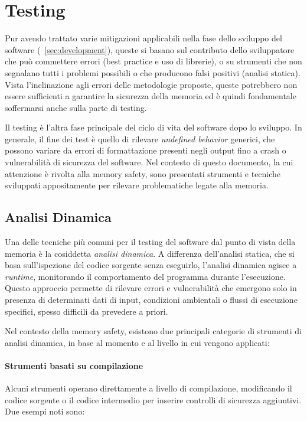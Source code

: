 \section{Testing}
\label{sec:testing}

Pur avendo trattato varie mitigazioni applicabili nella fase dello sviluppo del software
(~\autoref{sec:development}), queste si basano sul contributo dello sviluppatore
che può commettere errori (best practice e uso di librerie), o su strumenti che
non segnalano tutti i problemi possibili o che producono falsi positivi (analisi
statica). Vista l'inclinazione agli errori delle metodologie proposte, queste
potrebbero non essere sufficienti a garantire la sicurezza della memoria ed è
quindi fondamentale soffermarsi anche sulla parte di testing.

Il testing è l'altra fase principale del ciclo di vita del software dopo lo
sviluppo. In generale, il fine dei test è quello di rilevare \textit{undefined
behavior} generici, che possono variare da errori di formattazione presenti
negli output fino a crash o vulnerabilità di sicurezza del software. Nel contesto
di questo documento, la cui attenzione è rivolta alla memory safety, sono presentati
strumenti e tecniche sviluppati appositamente per rilevare problematiche legate alla
memoria.

\subsection{Analisi Dinamica}
\label{sec:analisi-dinamica}

Una delle tecniche più comuni per il testing del software dal punto di vista
della memoria è la cosiddetta \textit{analisi dinamica}. A differenza dell'analisi
statica, che si basa sull'ispezione del codice sorgente senza eseguirlo, l'analisi
dinamica agisce a \textit{runtime}, monitorando il comportamento del programma
durante l'esecuzione. Questo approccio permette di rilevare errori e vulnerabilità
che emergono solo in presenza di determinati dati di input, condizioni
ambientali o flussi di esecuzione specifici, spesso difficili da prevedere a priori.

Nel contesto della memory safety, esistono due principali categorie di strumenti
di analisi dinamica, in base al momento e al livello in cui vengono applicati:

\paragraph{Strumenti basati su compilazione}
Alcuni strumenti operano direttamente a livello di compilazione, modificando il codice
sorgente o il codice intermedio per inserire controlli di sicurezza aggiuntivi.
Due esempi noti sono:

